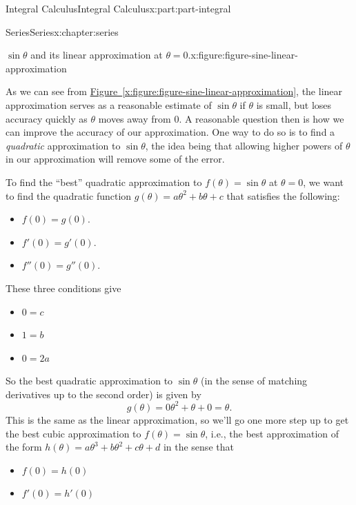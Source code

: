 \documentclass[twoside,10pt,]{book}
\newcommand{\xreffont}{\relax}
\numberwithin{equation}{part}
\begin{document}
\begin{partptx}{Integral Calculus}{}{Integral Calculus}{}{}{x:part:part-integral}
\begin{chapterptx}{Series}{}{Series}{}{}{x:chapter:series}
\begin{introduction}{}
\begin{figureptx}{\(\sin\theta\) and its linear approximation at \(\theta=0\).}{x:figure:figure-sine-linear-approximation}{}
\begin{image}{0}{1}{0}
{
}%
\end{image}%
\tcblower
\end{figureptx}%
As we can see from \hyperref[x:figure:figure-sine-linear-approximation]{Figure~{\xreffont\ref{x:figure:figure-sine-linear-approximation}}}, the linear approximation serves as a reasonable estimate of \(\sin\theta\) if \(\theta\) is small, but loses accuracy quickly as \(\theta\) moves away from \(0\). A reasonable question then is how we can improve the accuracy of our approximation. One way to do so is to find a \emph{quadratic} approximation to \(\sin\theta\), the idea being that allowing higher powers of \(\theta\) in our approximation will remove some of the error.%
\par
To find the ``best'' quadratic approximation to \(f(\theta) = \sin\theta\) at \(\theta = 0\), we want to find the quadratic function \(g(\theta) = a\theta^{2} + b\theta + c\) that satisfies the following:%
%
\begin{itemize}[label=\textbullet]
\item{}\(\displaystyle f(0) = g(0).\)%
\item{}\(\displaystyle f'(0) = g'(0).\)%
\item{}\(\displaystyle f''(0) = g''(0).\)%
\end{itemize}
These three conditions give%
%
\begin{itemize}[label=\textbullet]
\item{}\(\displaystyle 0 = c\)%
\item{}\(\displaystyle 1 = b\)%
\item{}\(\displaystyle 0 = 2a\)%
\end{itemize}
So the best quadratic approximation to \(\sin\theta\) (in the sense of matching derivatives up to the second order) is given by%
\begin{equation*}
g(\theta) = 0\theta^{2} + \theta + 0 = \theta.
\end{equation*}
This is the same as the linear approximation, so we'll go one more step up to get the best cubic approximation to \(f(\theta) = \sin\theta\), i.e.\@, the best approximation of the form \(h(\theta) = a\theta^{3} + b\theta^{2} + c\theta + d\) in the sense that%
%
\begin{itemize}[label=\textbullet]
\item{}\(\displaystyle f(0) = h(0)\)%
\item{}\(\displaystyle f'(0) = h'(0)\)%

\end{itemize}
\end{introduction}
\end{chapterptx}
\end{partptx}
\end{document}
